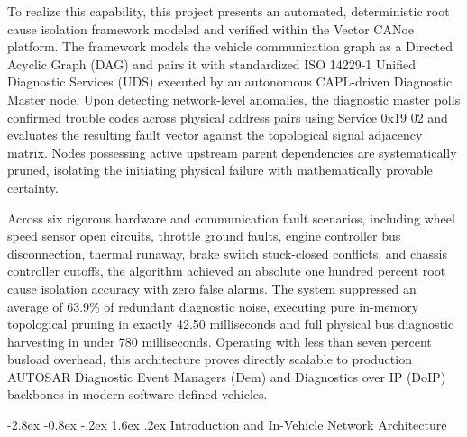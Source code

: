 \documentclass[11pt,a4paper]{article}
\makeatletter
\renewcommand{\section}{\@startsection{section}{1}{\z@}%
  {-2.8ex \@plus -0.8ex \@minus -.2ex}%
  {1.6ex \@plus.2ex}%
  {\normalfont\large\bfseries\color{tatablue}}}
\makeatother
\begin{document}
To realize this capability, this project presents an automated, deterministic root cause isolation framework modeled and verified within the Vector CANoe platform. The framework models the vehicle communication graph as a Directed Acyclic Graph (DAG) and pairs it with standardized ISO 14229-1 Unified Diagnostic Services (UDS) executed by an autonomous CAPL-driven Diagnostic Master node. Upon detecting network-level anomalies, the diagnostic master polls confirmed trouble codes across physical address pairs using Service 0x19 02 and evaluates the resulting fault vector against the topological signal adjacency matrix. Nodes possessing active upstream parent dependencies are systematically pruned, isolating the initiating physical failure with mathematically provable certainty. 

Across six rigorous hardware and communication fault scenarios, including wheel speed sensor open circuits, throttle ground faults, engine controller bus disconnection, thermal runaway, brake switch stuck-closed conflicts, and chassis controller cutoffs, the algorithm achieved an absolute one hundred percent root cause isolation accuracy with zero false alarms. The system suppressed an average of 63.9\% of redundant diagnostic noise, executing pure in-memory topological pruning in exactly 42.50 milliseconds and full physical bus diagnostic harvesting in under 780 milliseconds. Operating with less than seven percent busload overhead, this architecture proves directly scalable to production AUTOSAR Diagnostic Event Managers (Dem) and Diagnostics over IP (DoIP) backbones in modern software-defined vehicles.

\newpage
{}
{}
\tableofcontents

\newpage
{}
{}
\listoffigures

\newpage
{}
{}
\listoftables

\newpage
{}
\setcounter{page}{1}

\section{Introduction and In-Vehicle Network Architecture}
\end{document}
